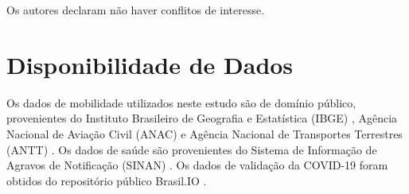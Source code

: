 \documentclass[preprint,12pt]{elsarticle}
\begin{document}
Os autores declaram não haver conflitos de interesse.

\section*{Disponibilidade de Dados}

Os dados de mobilidade utilizados neste estudo são de domínio público, provenientes do Instituto Brasileiro de Geografia e Estatística (IBGE) \cite{oliveira2024mobility, brasilibge2017ligacoes}, Agência Nacional de Aviação Civil (ANAC) \cite{oliveira2024mobility} e Agência Nacional de Transportes Terrestres (ANTT) \cite{inovacao2024modelagem}. Os dados de saúde são provenientes do Sistema de Informação de Agravos de Notificação (SINAN) \cite{inovacao2024modelagem, preprocessamento}. Os dados de validação da COVID-19 foram obtidos do repositório público Brasil.IO \cite{inovacao2024modelagem}.



\end{document}
